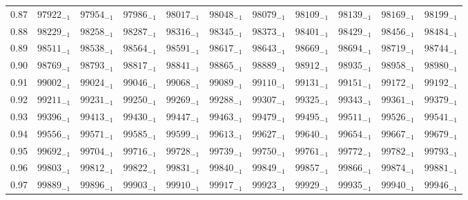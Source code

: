 \documentclass[10pt, a4paper]{article}
\begin{document}
\begin{center}
\begin{longtable}{c || c c c c c | c c c c c}
        0.87 & \({97922}_{-1}\) & \({97954}_{-1}\) & \({97986}_{-1}\) & \({98017}_{-1}\) & \({98048}_{-1}\) & \({98079}_{-1}\) & \({98109}_{-1}\) & \({98139}_{-1}\) & \({98169}_{-1}\) & \({98199}_{-1}\)\\
        0.88 & \({98229}_{-1}\) & \({98258}_{-1}\) & \({98287}_{-1}\) & \({98316}_{-1}\) & \({98345}_{-1}\) & \({98373}_{-1}\) & \({98401}_{-1}\) & \({98429}_{-1}\) & \({98456}_{-1}\) & \({98484}_{-1}\)\\
        0.89 & \({98511}_{-1}\) & \({98538}_{-1}\) & \({98564}_{-1}\) & \({98591}_{-1}\) & \({98617}_{-1}\) & \({98643}_{-1}\) & \({98669}_{-1}\) & \({98694}_{-1}\) & \({98719}_{-1}\) & \({98744}_{-1}\)\\
        \hline
        0.90 & \({98769}_{-1}\) & \({98793}_{-1}\) & \({98817}_{-1}\) & \({98841}_{-1}\) & \({98865}_{-1}\) & \({98889}_{-1}\) & \({98912}_{-1}\) & \({98935}_{-1}\) & \({98958}_{-1}\) & \({98980}_{-1}\)\\
        0.91 & \({99002}_{-1}\) & \({99024}_{-1}\) & \({99046}_{-1}\) & \({99068}_{-1}\) & \({99089}_{-1}\) & \({99110}_{-1}\) & \({99131}_{-1}\) & \({99151}_{-1}\) & \({99172}_{-1}\) & \({99192}_{-1}\)\\
        0.92 & \({99211}_{-1}\) & \({99231}_{-1}\) & \({99250}_{-1}\) & \({99269}_{-1}\) & \({99288}_{-1}\) & \({99307}_{-1}\) & \({99325}_{-1}\) & \({99343}_{-1}\) & \({99361}_{-1}\) & \({99379}_{-1}\)\\
        0.93 & \({99396}_{-1}\) & \({99413}_{-1}\) & \({99430}_{-1}\) & \({99447}_{-1}\) & \({99463}_{-1}\) & \({99479}_{-1}\) & \({99495}_{-1}\) & \({99511}_{-1}\) & \({99526}_{-1}\) & \({99541}_{-1}\)\\
        0.94 & \({99556}_{-1}\) & \({99571}_{-1}\) & \({99585}_{-1}\) & \({99599}_{-1}\) & \({99613}_{-1}\) & \({99627}_{-1}\) & \({99640}_{-1}\) & \({99654}_{-1}\) & \({99667}_{-1}\) & \({99679}_{-1}\)\\
        0.95 & \({99692}_{-1}\) & \({99704}_{-1}\) & \({99716}_{-1}\) & \({99728}_{-1}\) & \({99739}_{-1}\) & \({99750}_{-1}\) & \({99761}_{-1}\) & \({99772}_{-1}\) & \({99782}_{-1}\) & \({99793}_{-1}\)\\
        0.96 & \({99803}_{-1}\) & \({99812}_{-1}\) & \({99822}_{-1}\) & \({99831}_{-1}\) & \({99840}_{-1}\) & \({99849}_{-1}\) & \({99857}_{-1}\) & \({99866}_{-1}\) & \({99874}_{-1}\) & \({99881}_{-1}\)\\
        0.97 & \({99889}_{-1}\) & \({99896}_{-1}\) & \({99903}_{-1}\) & \({99910}_{-1}\) & \({99917}_{-1}\) & \({99923}_{-1}\) & \({99929}_{-1}\) & \({99935}_{-1}\) & \({99940}_{-1}\) & \({99946}_{-1}\)\\

\end{longtable}
\end{center}
\end{document}

